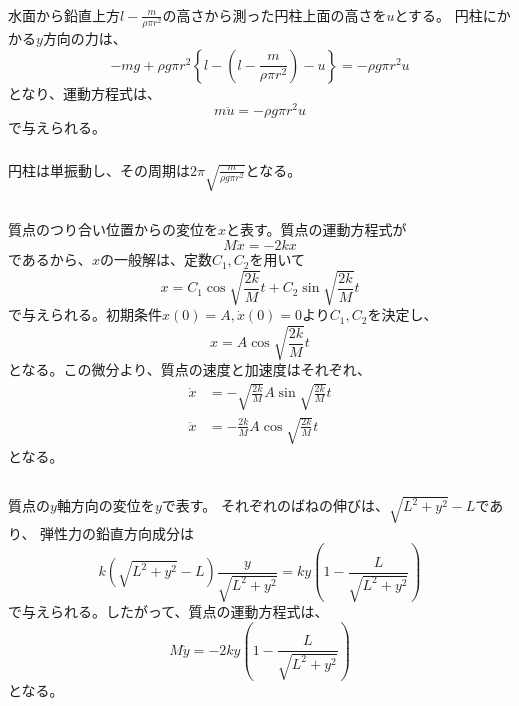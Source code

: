 \documentclass[a4paper]{jsarticle}
\begin{document}
\subsubsection{}
水面から鉛直上方$l - \frac{m}{\rho \pi r^2}$の高さから測った円柱上面の高さを$u$とする。
円柱にかかる$y$方向の力は、
\begin{equation}
  -m g + \rho g \pi r^2 \left\{l - \left(l - \frac{m}{\rho \pi r^2}\right) - u\right\}
  = -\rho g \pi r^2 u
\end{equation}
となり、運動方程式は、
\begin{equation}
  m \ddot{u} = -\rho g \pi r^2 u
\end{equation}
で与えられる。

\subsubsection{}
円柱は単振動し、その周期は$2 \pi \sqrt{\frac{m}{\rho g \pi r^2}}$となる。

\subsection{}
\subsubsection{}
質点のつり合い位置からの変位を$x$と表す。質点の運動方程式が
\begin{equation}
  M \ddot{x} = -2 k x
\end{equation}
であるから、$x$の一般解は、定数$C_1, C_2$を用いて
\begin{equation}
  x = C_1 \cos \sqrt{\frac{2k}{M}} t  + C_2 \sin \sqrt{\frac{2k}{M}} t
\end{equation}
で与えられる。初期条件$x(0) = A, \dot{x}(0) = 0$より$C_1, C_2$を決定し、
\begin{equation}
  x = A \cos \sqrt{\frac{2k}{M}} t
\end{equation}
となる。この微分より、質点の速度と加速度はそれぞれ、
\begin{align}
  \dot{x}  & = -\sqrt{\frac{2k}{M}} A \sin \sqrt{\frac{2k}{M}} t \\
  \ddot{x} & = -\frac{2k}{M} A \cos \sqrt{\frac{2k}{M}} t
\end{align}
となる。

\subsection{}
質点の$y$軸方向の変位を$y$で表す。
それぞれのばねの伸びは、$\sqrt{L^2 + y^2} - L$であり、
弾性力の鉛直方向成分は
\begin{equation}
  k \left(\sqrt{L^2 + y^2} - L\right) \frac{y}{\sqrt{L^2 + y^2}}
  = k y \left(1 - \frac{L}{\sqrt{L^2 + y^2}}\right)
\end{equation}
で与えられる。したがって、質点の運動方程式は、
\begin{equation}
  M \ddot{y} = -2k y \left(1 - \frac{L}{\sqrt{L^2 + y^2}}\right)
\end{equation}
となる。
\end{document}
